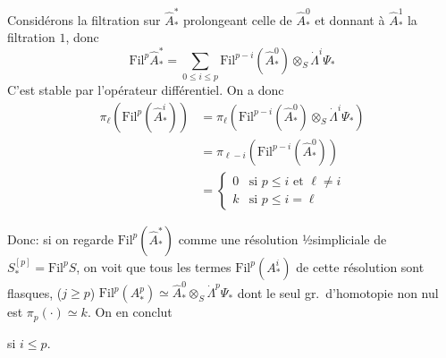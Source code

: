 \documentclass[11pt,a4paper]{article}
\begin{document}
Considérons la filtration  \ill{} sur $\widehat{A}^*_*$
prolongeant celle de $\widehat{A}^0_*$ et donnant \struck{\ill{}}
à $\widehat{A}^1_*$ la filtration $1$, donc
\[ \mathrm{Fil}^p\widehat{A}^*_* = \sum_{0 \leq i \leq p} \mathrm{Fil}^{p-i}(\widehat{A}^0_*) \otimes_S \dot\Lambda^i\Psi_* \]
C'est stable par l'opérateur différentiel.
On a donc
\begin{align*}
\pi_\ell(\mathrm{Fil}^p(\widehat{A}^i_*)) &= \pi_\ell(\mathrm{Fil}^{p-i}(\widehat{A}^0_*) \otimes_S \dot\Lambda^i\Psi_*) \\
&= \pi_{\ell-i}(\mathrm{Fil}^{p-i}(\widehat{A}^0_*)) \\
&= \begin{cases} 0 & \text{si } p \leq i \text{ et } \ell \neq i \\ k & \text{si } p \leq i = \ell \end{cases}
\end{align*}

Donc: 
si on regarde $\mathrm{Fil}^p(\widehat{A}^*_*)$ comme
une résolution ½simpliciale de $S^{[p]}_* = \mathrm{Fil}^pS$,
on voit que tous les termes $\mathrm{Fil}^p(A^i_*)$
de cette résolution  sont flasques, \struck{\ill{}}
\struck{\ill{}} ($j \geq p$) $\mathrm{Fil}^p(A^p_*) \simeq \widehat{A}^0_* \otimes_S \dot\Lambda^p\Psi_*$ dont
le seul gr.\ d'homotopie non nul est
$\pi_p(\cdot) \simeq k$. On en conclut


si $i \leq p$.
\end{document}
